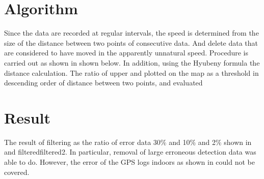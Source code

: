 \section{Algorithm}
Since the data are recorded at regular intervals, the speed is determined from the size of the distance between two points of consecutive data. And delete data that are considered to have moved in the apparently unnatural speed.
Procedure is carried out as shown in  shown below. In addition, using the Hyubeny formula the distance calculation.
The ratio of upper and plotted on the map as a threshold in descending order of distance between two points, and evaluated






\section{Result}
The result of filtering as the ratio of error data 30\% and 10\% and 2\% shown in  and filtered{filtered2}.
In particular, removal of large erroneous detection data was able to do. However, the error of the GPS logs indoors as shown in  could not be covered.

